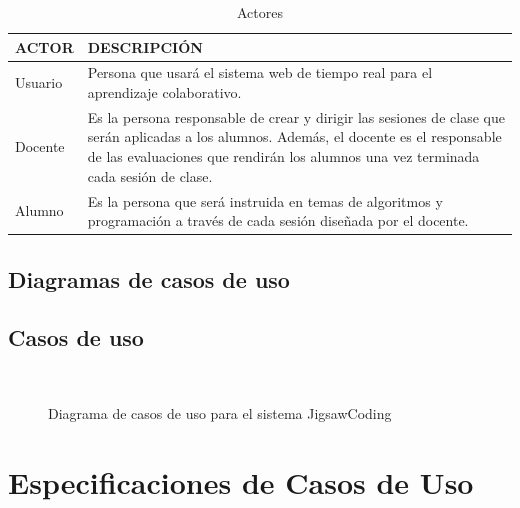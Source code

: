 \begin{longtable}{L{3cm}L{7cm}}
\caption{Actores}
\label{tab:actores}\\
    \toprule[0.8mm]
    ACTOR & DESCRIPCIÓN \\
    \midrule[0.6mm]
    Usuario & Persona que usará el sistema web de tiempo real para el aprendizaje colaborativo.\\
    \midrule
    Docente & Es la persona responsable de crear y dirigir las sesiones de clase que serán aplicadas a los alumnos. Además, el docente es el responsable de las evaluaciones que rendirán los alumnos una vez terminada cada sesión de clase.\\
    \midrule
    Alumno & Es la persona que será instruida en temas de algoritmos y programación a través de cada sesión diseñada por el docente.\\
    \bottomrule[0.8mm]
\end{longtable}
\clearpage
\begin{landscape}
\section{Diagramas de casos de uso}
\subsection{Casos de uso}
\begin{figure}[!h]
  \centering
  \\
  \caption[Casos de uso]{Diagrama de casos de uso para el sistema JigsawCoding}
  \label{fig:casos_de_uso}
\end{figure}
\end{landscape}
\clearpage

\section{Especificaciones de Casos de Uso}


